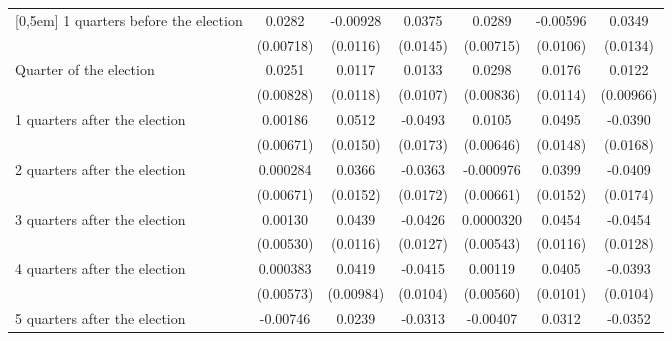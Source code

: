 \begin{table}[!ht]
\begin{tabular}{l*{6}{c}}
[0,5em]
 1 quarters before the election&      0.0282\sym{***}&    -0.00928         &      0.0375\sym{**} &      0.0289\sym{***}&    -0.00596         &      0.0349\sym{**} \\
                    &   (0.00718)         &    (0.0116)         &    (0.0145)         &   (0.00715)         &    (0.0106)         &    (0.0134)         \\
[0,5em]
Quarter of the election&      0.0251\sym{**} &      0.0117         &      0.0133         &      0.0298\sym{***}&      0.0176         &      0.0122         \\
                    &   (0.00828)         &    (0.0118)         &    (0.0107)         &   (0.00836)         &    (0.0114)         &   (0.00966)         \\
[0,5em]
 1 quarters after the election&     0.00186         &      0.0512\sym{***}&     -0.0493\sym{**} &      0.0105         &      0.0495\sym{***}&     -0.0390\sym{*}  \\
                    &   (0.00671)         &    (0.0150)         &    (0.0173)         &   (0.00646)         &    (0.0148)         &    (0.0168)         \\
[0,5em]
 2 quarters after the election&    0.000284         &      0.0366\sym{*}  &     -0.0363\sym{*}  &   -0.000976         &      0.0399\sym{**} &     -0.0409\sym{*}  \\
                    &   (0.00671)         &    (0.0152)         &    (0.0172)         &   (0.00661)         &    (0.0152)         &    (0.0174)         \\
[0,5em]
 3 quarters after the election&     0.00130         &      0.0439\sym{***}&     -0.0426\sym{***}&   0.0000320         &      0.0454\sym{***}&     -0.0454\sym{***}\\
                    &   (0.00530)         &    (0.0116)         &    (0.0127)         &   (0.00543)         &    (0.0116)         &    (0.0128)         \\
[0,5em]
 4 quarters after the election&    0.000383         &      0.0419\sym{***}&     -0.0415\sym{***}&     0.00119         &      0.0405\sym{***}&     -0.0393\sym{***}\\
                    &   (0.00573)         &   (0.00984)         &    (0.0104)         &   (0.00560)         &    (0.0101)         &    (0.0104)         \\
[0,5em]
 5 quarters after the election&    -0.00746         &      0.0239\sym{*}  &     -0.0313\sym{**} &    -0.00407         &      0.0312\sym{**} &     -0.0352\sym{**} \\

\end{tabular}
\end{table}
